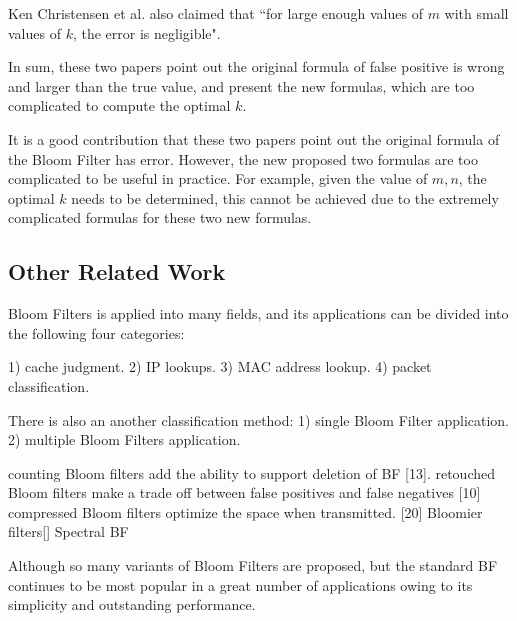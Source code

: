 Ken Christensen et al. also claimed that ``for large enough values of $m$ with small values of $k$, the error is negligible". 

In sum, these two papers point out the original formula of false positive is wrong and larger than the true value, and present the new formulas, which are too complicated to compute the optimal $k$. 

It is a good contribution that these two papers point out the original formula of the Bloom Filter has error. However, the new proposed two formulas are too complicated to be useful in practice. For example, given the value of $m, n$, the optimal $k$ needs to be determined, this cannot be achieved due to the extremely complicated formulas for these two new formulas. 

\subsection{Other Related Work}

Bloom Filters is applied into many fields, and its applications can be divided into the following four categories:

1) cache judgment.
2) IP lookups.
3) MAC address lookup.
4) packet classification.

There is also an another classification method:
1) single Bloom Filter application.
2) multiple Bloom Filters application.

counting Bloom filters add the ability to support deletion of BF [13].
retouched Bloom filters make a trade off between false positives and false negatives [10]
compressed Bloom filters optimize the space when transmitted. [20]
Bloomier filters[]
Spectral BF \cite{spectralBF}

Although so many variants of Bloom Filters are proposed, but the standard BF continues to be most popular in a great number of applications owing to its simplicity and outstanding performance. 